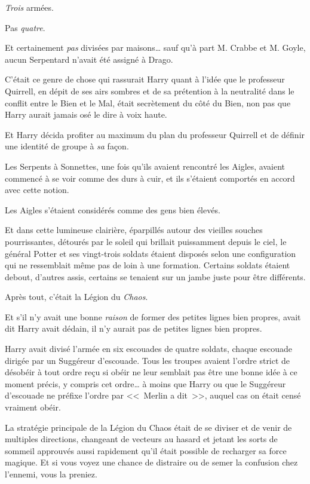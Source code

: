 \emph{Trois} armées.

Pas \emph{quatre}.

Et certainement \emph{pas} divisées par maisons… sauf qu'à part M. Crabbe et M. Goyle, aucun Serpentard n'avait été assigné à Drago.

C'était ce genre de chose qui rassurait Harry quant à l'idée que le professeur Quirrell, en dépit de ses airs sombres et de sa prétention à la neutralité dans le conflit entre le Bien et le Mal, était secrètement du côté du Bien, non pas que Harry aurait jamais osé le dire à voix haute.

Et Harry décida profiter au maximum du plan du professeur Quirrell et de définir une identité de groupe à \emph{sa} façon.

Les Serpents à Sonnettes, une fois qu'ils avaient rencontré les Aigles, avaient commencé à se voir comme des durs à cuir, et ils s'étaient comportés en accord avec cette notion.

Les Aigles s'étaient considérés comme des gens bien élevés.

Et dans cette lumineuse clairière, éparpillés autour des vieilles souches pourrissantes, détourés par le soleil qui brillait puissamment depuis le ciel, le général Potter et ses vingt-trois soldats étaient disposés selon une configuration qui ne ressemblait même pas de loin à une formation. Certains soldats étaient debout, d'autres assis, certains se tenaient sur un jambe juste pour être différents.

Après tout, c'était la Légion du \emph{Chaos}.

Et s'il n'y avait une bonne \emph{raison} de former des petites lignes bien propres, avait dit Harry avait dédain, il n'y aurait pas de petites lignes bien propres.

Harry avait divisé l'armée en six escouades de quatre soldats, chaque escouade dirigée par un Suggéreur d'escouade. Tous les troupes avaient l'ordre strict de désobéir à tout ordre reçu si obéir ne leur semblait pas être une bonne idée à ce moment précis, y compris cet ordre… à moins que Harry ou que le Suggéreur d'escouade ne préfixe l'ordre par <<~Merlin a dit~>>, auquel cas on était censé vraiment obéir.

La stratégie principale de la Légion du Chaos était de se diviser et de venir de multiples directions, changeant de vecteurs au hasard et jetant les sorts de sommeil approuvés aussi rapidement qu'il était possible de recharger sa force magique. Et si vous voyez une chance de distraire ou de semer la confusion chez l'ennemi, vous la preniez.

